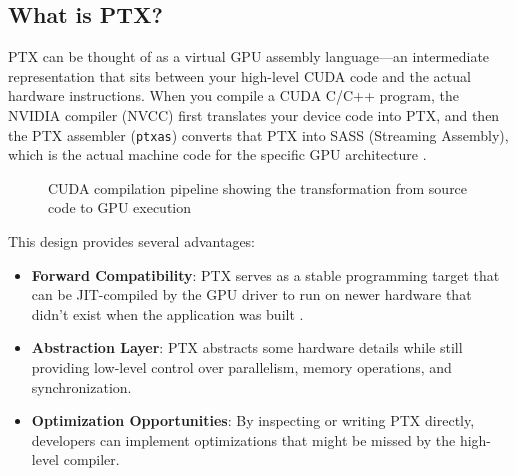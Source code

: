 \subsection{What is PTX?}

PTX can be thought of as a virtual GPU assembly language—an intermediate representation that sits between your high-level CUDA code and the actual hardware instructions. When you compile a CUDA C/C++ program, the NVIDIA compiler (NVCC) first translates your device code into PTX, and then the PTX assembler (\texttt{ptxas}) converts that PTX into SASS (Streaming Assembly), which is the actual machine code for the specific GPU architecture \citep{nvidia_ptx_blog}.

\begin{figure}[h]
    \centering
    \caption{CUDA compilation pipeline showing the transformation from source code to GPU execution}
    \label{fig:cuda_pipeline}
\end{figure}

This design provides several advantages:

\begin{itemize}
    \item \textbf{Forward Compatibility}: PTX serves as a stable programming target that can be JIT-compiled by the GPU driver to run on newer hardware that didn't exist when the application was built \citep{nvidia_ptx_blog}.
    
    \item \textbf{Abstraction Layer}: PTX abstracts some hardware details while still providing low-level control over parallelism, memory operations, and synchronization.
    
    \item \textbf{Optimization Opportunities}: By inspecting or writing PTX directly, developers can implement optimizations that might be missed by the high-level compiler.
\end{itemize}

